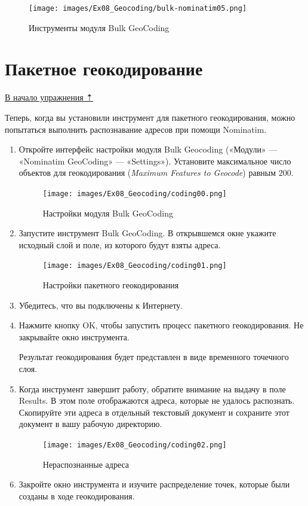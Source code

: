 \documentclass[
  12pt,
]{book}
\begin{document}
\begin{figure}
\centering
\texttt{[image: images/Ex08\_Geocoding/bulk-nominatim05.png]}
\caption{Инструменты модуля Bulk GeoCoding}
\end{figure}

\hypertarget{geocoding-batch}{%
\section{Пакетное геокодирование}\label{geocoding-batch}}

\protect\hyperlink{geocoding}{В начало упражнения ⇡}

Теперь, когда вы установили инструмент для пакетного геокодирования, можно попытаться выполнить распознавание адресов при помощи Nominatim.

\begin{enumerate}
\def\labelenumi{\arabic{enumi}.}
\item
  Откройте интерфейс настройки модуля Bulk Geocoding («Модули» --- «Nominatim GeoCoding» --- «Settings»). Установите максимальное число объектов для геокодирования (\emph{Maximum Features to Geocode}) равным \(200\).

  \begin{figure}
  \centering
  \texttt{[image: images/Ex08\_Geocoding/coding00.png]}
  \caption{Настройки модуля Bulk GeoCoding}
  \end{figure}
\item
  Запустите инструмент Bulk GeoCoding. В открывшемся окне укажите исходный слой и поле, из которого будут взяты адреса.

  \begin{figure}
  \centering
  \texttt{[image: images/Ex08\_Geocoding/coding01.png]}
  \caption{Настройки пакетного геокодирования}
  \end{figure}
\item
  Убедитесь, что вы подключены к Интернету.
\item
  Нажмите кнопку OK, чтобы запустить процесс пакетного геокодирования. Не закрывайте окно инструмента.

  Результат геокодирования будет представлен в виде временного точечного слоя.
\item
  Когда инструмент завершит работу, обратите внимание на выдачу в поле Results. В этом поле отображаются адреса, которые не удалось распознать. Скопируйте эти адреса в отдельный текстовый документ и сохраните этот документ в вашу рабочую директорию.

  \begin{figure}
  \centering
  \texttt{[image: images/Ex08\_Geocoding/coding02.png]}
  \caption{Нераспознанные адреса}
  \end{figure}
\item
  Закройте окно инструмента и изучите распределение точек, которые были созданы в ходе геокодирования.


\end{enumerate}
\end{document}
